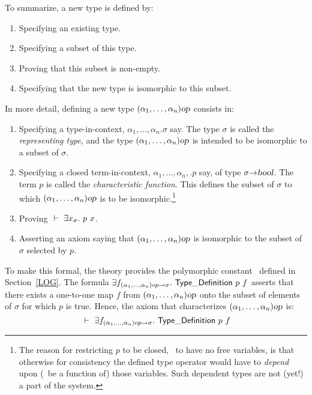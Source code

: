 To summarize, a new type is defined by:
\begin{enumerate}
\item Specifying an existing type.
\item Specifying a subset of this type.
\item Proving that this subset is non-empty.
\item Specifying that the new type is isomorphic to this subset.
\end{enumerate}

\noindent In more detail,
defining a new type $(\alpha_1,\ldots,\alpha_n)\textsl{op}$ consists in:
\begin{enumerate}
\item
Specifying a type-in-context, $\alpha_1,\ldots,\alpha_n.\sigma$ say.
The type
$\sigma$ is called the {\it representing type\/}, and the type
$(\alpha_1,\ldots,\alpha_n)\textsl{op}$ is intended to be isomorphic to a
subset of $\sigma$.

\item
Specifying a closed term-in-context, $\alpha_1,\ldots,\alpha_n,.p$
say, of type $\sigma{\to}\textsl{bool}$. The term $p$ is called the {\it
characteristic function\/}.  This defines the subset of $\sigma$ to which
$(\alpha_1,\ldots,\alpha_n)\textsl{op}$ is to be isomorphic.\footnote{The
reason for restricting $p$ to be closed, \ie\ to have no free
variables, is that otherwise for consistency the defined type operator
would have to {\em depend\/} upon (\ie\ be a function of) those
variables. Such dependent types are not (yet!) a part of the \HOL{} system.}

\item
Proving $\turn \equant{x_{\sigma}} p\ x$.

\item
Asserting an axiom saying that $(\alpha_1,\ldots,\alpha_n)\textsl{op}$ is
isomorphic to the subset of $\sigma$ selected by $p$.

\end{enumerate}

To make this formal, the theory  provides
the polymorphic constant \TyDef\ defined in Section~\ref{LOG}.
The formula
$\equant{f_{(\alpha_1,\ldots,\alpha_n)\ty{op}\fun\sigma}}\TyDef\ p\ f$
asserts that
there exists a one-to-one map $f$ from $(\alpha_1,\ldots,\alpha_n)\textsl{op}$
onto the subset of elements of $\sigma$ for which $p$ is true.
Hence, the axiom that characterizes $(\alpha_1,\ldots,\alpha_n)\textsl{op}$ is:
\[
\ \vdash\  \exists f_{(\alpha_1,\ldots,\alpha_n)\textsl{op}{\to}\sigma}.\ {\sf Type\_Definition}\
p\ f
\]

